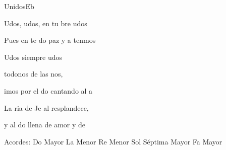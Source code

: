 \documentclass[12pt, spanish]{book}
\begin{document}
\begin{song}{Unidos}{Eb}
\begin{SBExtraKeys}
{            \begin{SBOpGroup}
                Udos, udos, en tu bre udos
            \end{SBOpGroup}

            \begin{SBOpGroup}
                Pues en te do paz y a tenmos
            \end{SBOpGroup}

            \begin{SBChorus}
                Udos siempre udos

                todonos de las nos,

                imos por el do cantando al a
            \end{SBChorus}

            \begin{SBOpGroup}
                La ria de Je al  resplandece,

                y al do llena de amor y de ~~
            \end{SBOpGroup}


            \ifChordBk
            \begin{SBOpGroup}
                Acordes:
                \upchord{\C}\qquad Do Mayor \hfill
                \upchord{\Am}\qquad La Menor \hfill\null\break
                \upchord{\Dm}Re Menor \hfill
                \upchord{\Gseven}\qquad Sol S\'eptima Mayor \hfill\null\break
                \upchord{\F}\qquad Fa Mayor \hfill\null\break
            \end{SBOpGroup}
            \fi
        }\end{SBExtraKeys}
    \end{song}
\end{document}
